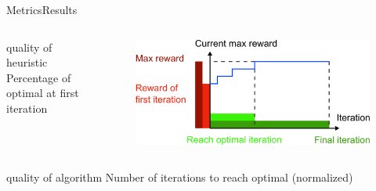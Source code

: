 \begin{frame}{Metrics}{Results}

\begin{columns}

\begin{minipage}{\textwidth}
\begin{block}{quality of heuristic}
{\small 
\textcolor{metric-OFI}{Percentage of optimal at first iteration}
}
\end{block}
\end{minipage}

\begin{figure}
\includegraphics[width=\textwidth]{./figure/metric2}
\end{figure}

\end{columns}

\begin{columns}


\begin{center}
\begin{minipage}{0.43\textwidth}
\begin{block}{quality of algorithm}
{\small 
\textcolor{metric-IRO}{Number of iterations to reach optimal (normalized)}
}
\end{block}
\end{minipage}
\end{center}

\end{columns}

\end{frame}

